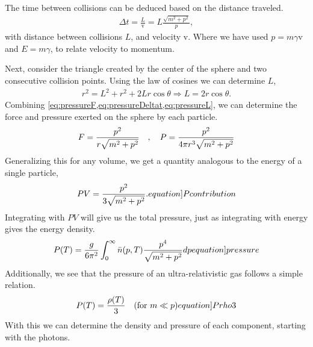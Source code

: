 The time between collisions can be deduced based on the distance traveled.
\begin{align}
    \Delta t = \frac{L}{\mathrm{v}}=L\frac{\sqrt{m^2+p^2}}{p},
    \label{eq:pressureDeltat}
\end{align}
with distance between collisions $L$, and velocity $\mathrm{v}$. Where we have used $p=m\gamma \mathrm{v}$ and $E=m\gamma$, to relate velocity to momentum.

Next, consider the triangle created by the center of the sphere and two consecutive collision points. Using the law of cosines we can determine $L$,
\begin{align}
    r^2=L^2+r^2+2L r \cos \theta \Rightarrow
    L = 2r \cos \theta.
    \label{eq:pressureL}
\end{align}
Combining \cref{eq:pressureF,eq:pressureDeltat,eq:pressureL}, we can determine the force and pressure exerted on the sphere by each particle. 
\begin{align}
    F = \frac{p^2}{r\sqrt{m^2+p^2}} \quad , \quad P = \frac{p^2}{4\pi r^3\sqrt{m^2+p^2}}
\end{align}
Generalizing this for any volume, we get a quantity analogous to the energy of a single particle,
\begin{align}
    PV=\frac{p^2}{3\sqrt{m^2+p^2}} .
    \label[equation]{Pcontribution}
\end{align}
Integrating with $PV$ will give us the total pressure, just as integrating with energy gives the energy density.
\begin{align}
    P(T)=\frac{g}{6\pi^2}\int_{0}^{\infty}\bar{n}(p,T)\frac{p^4}{\sqrt{m^2+p^2}}dp
    \label[equation]{pressure}
\end{align}
Additionally, we see that the pressure of an ultra-relativistic gas follows a simple relation.
\begin{align}
    P(T)=\frac{\rho(T)}{3} \quad (\text{for } m\ll p)
    \label[equation]{Prho3}
\end{align}
With this we can determine the density and pressure of each component, starting with the photons.


